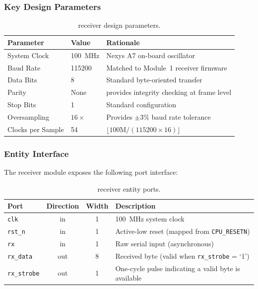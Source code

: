 \documentclass[11pt,letterpaper]{article}
\begin{document}
	\subsubsection{Key Design Parameters}

	\begin{table}[ht!]
		\centering
		\caption{\UART{} receiver design parameters.}
		\label{tab:uart_params}
		\renewcommand{\arraystretch}{1.3}
		\begin{tabular}{l l l}
			\toprule
			\textbf{Parameter} & \textbf{Value} & \textbf{Rationale} \\
			\midrule
			System Clock & 100~MHz & Nexys A7 on-board oscillator \\
			Baud Rate & 115200 & Matched to Module~1 receiver firmware \\
			Data Bits & 8 & Standard byte-oriented transfer \\
			Parity & None & \CRC{} provides integrity checking at frame level \\
			Stop Bits & 1 & Standard configuration \\
			Oversampling & $16\times$ & Provides $\pm 3\%$ baud rate tolerance \\
			Clocks per Sample & 54 & $\lfloor 100\text{M} / (115200 \times 16) \rfloor$ \\
			\bottomrule
		\end{tabular}
	\end{table}

	\subsubsection{Entity Interface}

	The \UART{} receiver module exposes the following port interface:

	\begin{table}[ht!]
		\centering
		\caption{\UART{} receiver entity ports.}
		\label{tab:uart_ports}
		\renewcommand{\arraystretch}{1.3}
		\begin{tabularx}{\textwidth}{l c c X}
			\toprule
			\textbf{Port} & \textbf{Direction} & \textbf{Width} & \textbf{Description} \\
			\midrule
			\texttt{clk} & in & 1 & 100~MHz system clock \\
			\texttt{rst\_n} & in & 1 & Active-low reset (mapped from \texttt{CPU\_RESETN}) \\
			\texttt{rx} & in & 1 & Raw \UART{} serial input (asynchronous) \\
			\texttt{rx\_data} & out & 8 & Received byte (valid when \texttt{rx\_strobe} = `1') \\
			\texttt{rx\_strobe} & out & 1 & One-cycle pulse indicating a valid byte is available \\
			\bottomrule
		\end{tabularx}
	\end{table}
\end{document}
